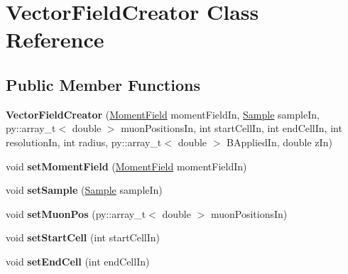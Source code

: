 \hypertarget{class_vector_field_creator}{}\section{Vector\+Field\+Creator Class Reference}
\label{class_vector_field_creator}
\subsection*{Public Member Functions}
\begin{DoxyCompactItemize}
\item 
\mbox{\label{class_vector_field_creator_a147179c9060856991616dd37107cdf0a}} 
{\bfseries Vector\+Field\+Creator} (\mbox{\hyperlink{class_moment_field}{Moment\+Field}} moment\+Field\+In, \mbox{\hyperlink{class_sample}{Sample}} sample\+In, py\+::array\+\_\+t$<$ double $>$ muon\+Positions\+In, int start\+Cell\+In, int end\+Cell\+In, int resolution\+In, int radius, py\+::array\+\_\+t$<$ double $>$ B\+Applied\+In, double z\+In)
\item 
\mbox{\label{class_vector_field_creator_ac534879bf5e588460b5480895ab752ad}} 
void {\bfseries set\+Moment\+Field} (\mbox{\hyperlink{class_moment_field}{Moment\+Field}} moment\+Field\+In)
\item 
\mbox{\label{class_vector_field_creator_a11a1af17f808eed250d7f5cb7cfc4d17}} 
void {\bfseries set\+Sample} (\mbox{\hyperlink{class_sample}{Sample}} sample\+In)
\item 
\mbox{\label{class_vector_field_creator_a72c933a46ba13f6ab67598390a2f9c02}} 
void {\bfseries set\+Muon\+Pos} (py\+::array\+\_\+t$<$ double $>$ muon\+Positions\+In)
\item 
\mbox{\label{class_vector_field_creator_abf474ce6e7f502eb064a245dc6dbddd5}} 
void {\bfseries set\+Start\+Cell} (int start\+Cell\+In)
\item 
\mbox{\label{class_vector_field_creator_a2cb02ad4dcea91062d0dcedbeec4df45}} 
void {\bfseries set\+End\+Cell} (int end\+Cell\+In)
\item 
\mbox{\label{class_vector_field_creator_a7c7869f19269142d3c0f55825bc4705a}} 

\end{DoxyCompactItemize}
